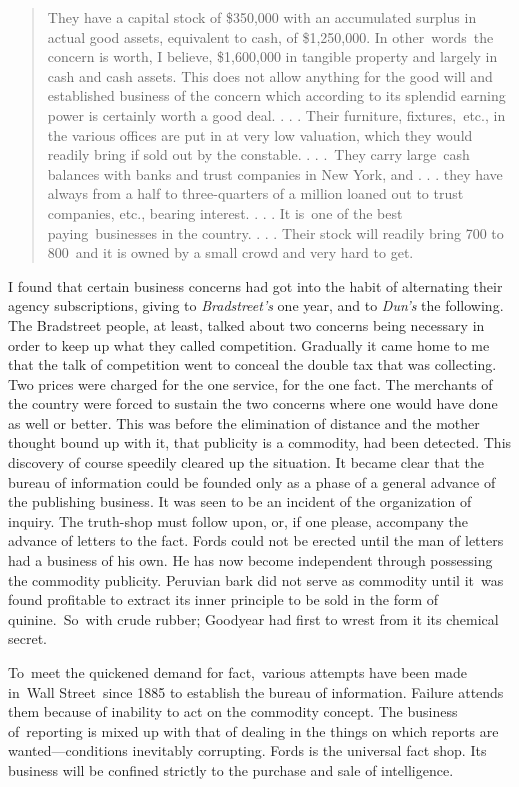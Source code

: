\documentclass[openany,nobib]{tufte-book}
\begin{document}
\begin{quote}
They have a capital stock of \$350,000 with an accumulated surplus in
actual good assets, equivalent to cash, of \$1,250,000. In
other~words~the concern is worth, I believe, \$1,600,000 in tangible
property and largely in cash and cash assets. This does not allow
anything for the good will and established business of the concern which
according to its splendid earning power is certainly worth a good deal.
. . . Their furniture, fixtures,~etc., in the various offices are put in
at very low valuation, which they would readily bring if sold out by the
constable. . . .~They carry large~cash balances with banks and trust
companies in New York, and . . . they have always from a half to
three-quarters of a million loaned out to trust companies, etc., bearing
interest. . . . It is~one of the best paying~businesses in the country.
. . . Their stock will readily bring 700 to 800~and it is owned by a
small crowd and very hard to get.~
\end{quote}

I found that certain business concerns had got into the habit of
alternating their agency subscriptions, giving to \emph{Bradstreet's}
one year, and to \emph{Dun's} the following. The Bradstreet people, at
least, talked about two concerns being necessary in order to keep up
what they called competition. Gradually it came home to me that the talk
of competition went to conceal the double tax that was collecting. Two
prices were charged for the one service, for the one fact. The merchants
of the country were forced to sustain the two concerns where one would
have done as well or better. This was before the elimination of distance
and the mother thought bound up with it, that publicity is a commodity,
had been detected. This discovery of course speedily cleared up the
situation. It became clear that the bureau of information could be
founded only as a phase of a general advance of the publishing business.
It was seen to be an incident of the organization of inquiry. The
truth-shop must follow upon, or, if one please, accompany the advance of
letters to the fact. Fords could not be erected until the man of letters
had a business of his own. He has now become independent through
possessing the commodity publicity. Peruvian bark did not serve as
commodity until it~was found profitable to extract its inner principle
to be sold in the form of quinine.~So~with crude rubber; Goodyear had
first to wrest from it its chemical secret.~~

To~meet the quickened demand for fact,~various attempts have been made
in~Wall Street~since 1885 to establish the bureau of information.
Failure attends them because of inability to act on the commodity
concept. The business of~reporting is mixed up with that of dealing in
the things on which reports are wanted---conditions inevitably
corrupting. Fords is the universal fact shop. Its business will be
confined strictly to the purchase and sale of intelligence.~
\end{document}
